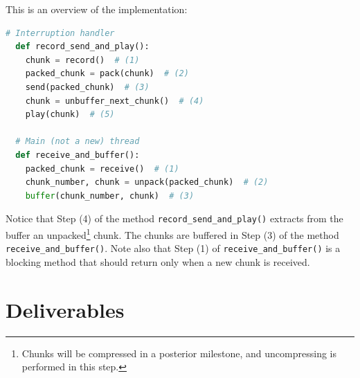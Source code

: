 This is an overview of the implementation:

\begin{lstlisting}[language=Python]
  # Interruption handler
  def record_send_and_play():
    chunk = record()  # (1)
    packed_chunk = pack(chunk)  # (2)
    send(packed_chunk)  # (3)
    chunk = unbuffer_next_chunk()  # (4)
    play(chunk)  # (5)

  # Main (not a new) thread
  def receive_and_buffer():
    packed_chunk = receive()  # (1)
    chunk_number, chunk = unpack(packed_chunk)  # (2)
    buffer(chunk_number, chunk)  # (3)
\end{lstlisting}

Notice that Step (4) of the method \verb|record_send_and_play()|
extracts from the buffer an unpacked\footnote{Chunks will be
  compressed in a posterior milestone, and uncompressing is performed
  in this step.} chunk. The chunks are buffered in Step (3) of the
method \verb|receive_and_buffer()|. Note also that Step (1) of
\verb|receive_and_buffer()| is a blocking method that should return
only when a new chunk is received.


\section{Deliverables}
\label{sec:homework}

